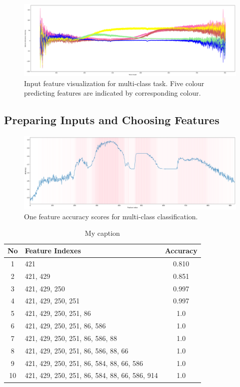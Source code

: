 \documentclass[11pt]{article}
\begin{document}
			\begin{figure}[H]
				\includegraphics[width=1\textwidth]{png/multi_default}
				\caption{Input feature visualization for multi-class task. Five colour predicting features are indicated by corresponding colour.}
				\label{fig:multi}
			\end{figure}
		\subsection{Preparing Inputs and Choosing Features}
		\begin{figure}[H]
				\includegraphics[width=1\textwidth]{png/multi_one}
				\caption{One feature accuracy scores for multi-class classification.}
				\label{fig:multi_one}
		\end{figure}

		\begin{center}
		  	\begin{table}
		  	\centering
			\begin{tabular}[b]{|c | l | c|}
				 \hline
				 No & Feature Indexes 	  						    & Accuracy \\ 
				 \hline
				 1 & 421 											& 0.810 \\ 
				 2 & 421, 429 										& 0.851 \\ 
				 3 & 421, 429, 250 									& 0.997 \\ 
				 4 & 421, 429, 250, 251 							& 0.997 \\ 
				 5 & 421, 429, 250, 251, 86 						& 1.0 	\\ 
				 6 & 421, 429, 250, 251, 86, 586 					& 1.0 	\\ 
				 7 & 421, 429, 250, 251, 86, 586, 88 				& 1.0 	\\ 
				 8 & 421, 429, 250, 251, 86, 586, 88, 66 			& 1.0 	\\ 
				 9 & 421, 429, 250, 251, 86, 584, 88, 66, 586 		& 1.0 	\\ 
				 10 & 421, 429, 250, 251, 86, 584, 88, 66, 586, 914 & 1.0 	\\ 
				 \hline
			\end{tabular}
			\caption{My caption}
			\label{tbl:accuracy_table}
			\end{table}
		\end{center}
\end{document}
